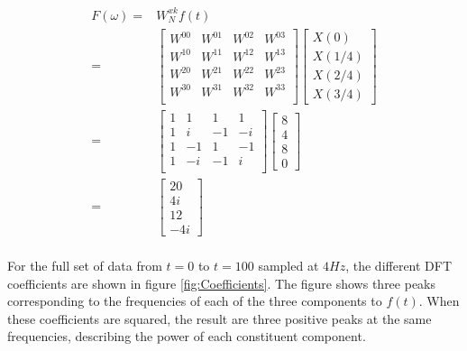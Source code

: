 \documentclass[twocolumn]{article}
\begin{document}
\begin{equation}
\begin{split}
F(\omega) =& W^{xk}_N f(t) \\
=&\begin{bmatrix}
W^{00} & W^{01} & W^{02} & W^{03} \\
W^{10} & W^{11} & W^{12} & W^{13} \\
W^{20} & W^{21} & W^{22} & W^{23} \\
W^{30} & W^{31} & W^{32} & W^{33} \\
\end{bmatrix} \begin{bmatrix}X(0) \\ X(1/4) \\ X(2/4) \\ X(3/4)\end{bmatrix} \\
=& \begin{bmatrix}
1 & 1 & 1 & 1 \\
1 & i & -1 & -i \\
1 & -1 & 1 & -1 \\
1 & -i & -1 & i \\
\end{bmatrix} \begin{bmatrix}8 \\ 4 \\ 8 \\ 0\end{bmatrix} \\
=& \begin{bmatrix}20 \\ 4i \\ 12 \\ -4i\end{bmatrix} \\
\end{split}
\end{equation}

For the full set of data from $t=0$ to $t=100$ sampled at $4Hz$, the different DFT coefficients are shown in figure \ref{fig:Coefficients}. The figure shows three peaks corresponding to the frequencies of each of the three components to $f(t)$. When these coefficients are squared, the result are three positive peaks at the same frequencies, describing the power of each constituent component.
\end{document}
